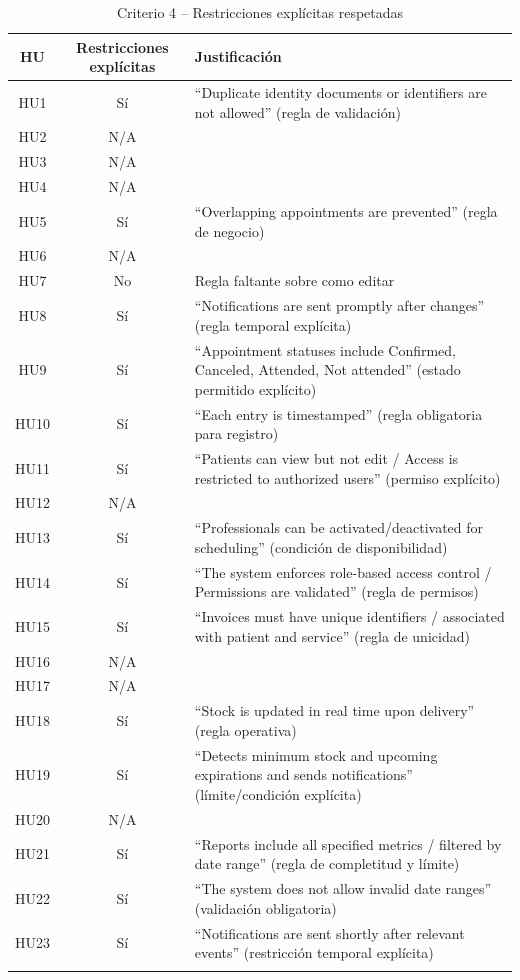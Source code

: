 \begin{longtable}{|c|c|p{6cm}|}
\hline
\textbf{HU} & \textbf{Restricciones explícitas} & \textbf{Justificación} \\
\hline
HU1 & Sí & “Duplicate identity documents or identifiers are not allowed” (regla de validación) \\
\hline
HU2 & N/A &  \\
\hline
HU3 & N/A &  \\
\hline
HU4 & N/A &  \\
\hline
HU5 & Sí & “Overlapping appointments are prevented” (regla de negocio) \\
\hline
HU6 & N/A &  \\
\hline
HU7 & No & Regla faltante sobre como editar \\
\hline
HU8 & Sí & “Notifications are sent promptly after changes” (regla temporal explícita) \\
\hline
HU9 & Sí & “Appointment statuses include Confirmed, Canceled, Attended, Not attended” (estado permitido explícito) \\
\hline
HU10 & Sí & “Each entry is timestamped” (regla obligatoria para registro) \\
\hline
HU11 & Sí & “Patients can view but not edit / Access is restricted to authorized users” (permiso explícito) \\
\hline
HU12 & N/A & \\
\hline
HU13 & Sí & “Professionals can be activated/deactivated for scheduling” (condición de disponibilidad) \\
\hline
HU14 & Sí & “The system enforces role-based access control / Permissions are validated” (regla de permisos) \\
\hline
HU15 & Sí & “Invoices must have unique identifiers / associated with patient and service” (regla de unicidad) \\
\hline
HU16 & N/A &  \\
\hline
HU17 & N/A &  \\
\hline
HU18 & Sí & “Stock is updated in real time upon delivery” (regla operativa) \\
\hline
HU19 & Sí & “Detects minimum stock and upcoming expirations and sends notifications” (límite/condición explícita) \\
\hline
HU20 & N/A &  \\
\hline
HU21 & Sí & “Reports include all specified metrics / filtered by date range” (regla de completitud y límite) \\
\hline
HU22 & Sí & “The system does not allow invalid date ranges” (validación obligatoria) \\
\hline
HU23 & Sí & “Notifications are sent shortly after relevant events” (restricción temporal explícita) \\
\hline
\caption{Criterio 4 – Restricciones explícitas respetadas}
\end{longtable}

